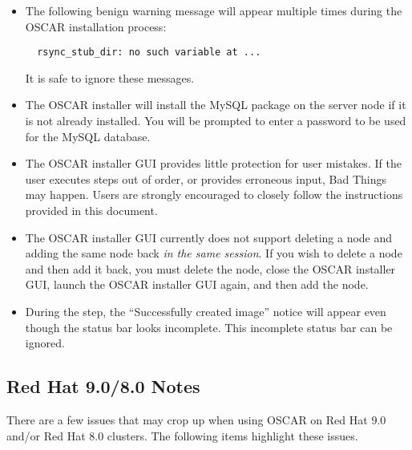 \begin{itemize}
\item The following benign warning message will appear multiple times
  during the OSCAR installation process:

\begin{verbatim}
  rsync_stub_dir: no such variable at ...
\end{verbatim}

  It is safe to ignore these messages.
  
\item The OSCAR installer will install the MySQL package on the server
  node if it is not already installed.  You will be prompted to enter a
\begchange
  password to be used for the MySQL database.
\endchange  

\item The OSCAR installer GUI provides little protection for user
  mistakes.  If the user executes steps out of order, or provides
  erroneous input, Bad Things may happen.  Users are strongly
  encouraged to closely follow the instructions provided in this
  document.

\item The OSCAR installer GUI currently does not support deleting a
  node and adding the same node back {\em in the same session}.  If
  you wish to delete a node and then add it back, you must delete the
  node, close the OSCAR installer GUI, launch the OSCAR installer GUI
  again, and then add the node.

\item During the  step, the ``Successfully
  created image'' notice will appear even though the status bar looks
  incomplete.  This incomplete status bar can be ignored.

\end{itemize}


\subsection{Red Hat 9.0/8.0 Notes}
\label{subsec:rh90notes}

There are a few issues that may crop up when using OSCAR on Red Hat 9.0
and/or Red Hat 8.0 clusters.  The following items highlight these
issues.  

